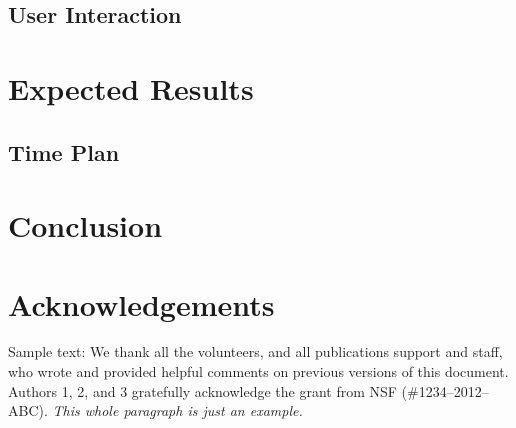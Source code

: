 \documentclass{sigchi}
\begin{document}
\subsection{User Interaction}

\section{Expected Results}


\subsection{Time Plan}



\section{Conclusion}


\section{Acknowledgements}

Sample text: We thank all the volunteers, and all publications support
and staff, who wrote and provided helpful comments on previous
versions of this document. Authors 1, 2, and 3 gratefully acknowledge
the grant from NSF (\#1234--2012--ABC). \textit{This whole paragraph is
  just an example.}

%
%
%
%
%
\balance{}

\balance{}



\end{document}
